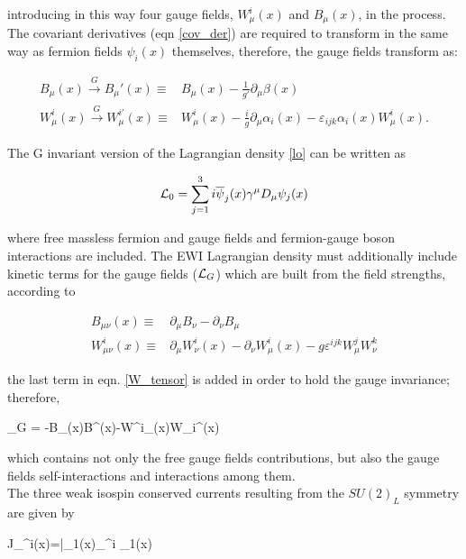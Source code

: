 \noindent introducing in this way four gauge fields, $W_\mu^i(x)$ and $B_\mu(x)$, in the process. The covariant derivatives (eqn \ref{cov_der}) are required to transform in the same way as fermion fields $\psi_i(x)$ themselves, therefore, the gauge fields transform as:

\begin{align}\label{f_transf}
B_\mu(x) \xrightarrow[]{G} B_\mu'(x)\equiv & B_\mu(x)
- \frac{1}{g'}\partial_\mu\beta(x) \nonumber\\
W^i_\mu(x) \xrightarrow[]{G} W_\mu^{i\prime}(x)\equiv & W^i_\mu(x) - \frac{i}{g}\partial_\mu \alpha_i(x) - \varepsilon_{ijk}\alpha_i(x)W^i_\mu(x).
\end{align}

\noindent The G invariant version of the Lagrangian density \ref{lo} can be written as

\begin{equation}\label{linv}
\mathcal{L}_0 = \sum_{j=1}^3 i\overline{\psi}_j(x)\gamma^\mu D_\mu \psi_j(x)
\end{equation}

\noindent where free massless fermion and gauge fields and fermion-gauge boson interactions are included. The EWI Lagrangian density must additionally include kinetic terms for the gauge fields ($\mathcal{L}_G$) which are built from the field strengths, according to

\begin{align}
B_{\mu\nu}(x)   \equiv & \partial_\mu B_\nu -  \partial_\nu B_\mu \label{B_tensor} \\ 
W^i_{\mu\nu}(x) \equiv & \partial_\mu W^i_\nu(x) - \partial_\nu W^i_\mu(x) - g\varepsilon^{ijk}W^j_\mu W^k_\nu \label{W_tensor}
\end{align}

\noindent the last term in eqn. \ref{W_tensor} is added in order to hold the gauge invariance; therefore,

\beqn\label{lg}
\Lagr_G = -B_{\mu\nu}(x)B^{\mu\nu}(x)-W^i_{\mu\nu}(x)W_i^{\mu\nu}(x)
\eeqn

\noindent which contains not only the free gauge fields contributions, but also the gauge fields self-interactions and interactions among them.\\  

\noindent The three weak isospin conserved currents resulting from the $SU(2)_L$ symmetry are given by

\beqn
J_\mu^i(x)=\bar{\psi_1}(x)\gamma_\mu \sigma^i \psi_1(x) 
\eeqn


